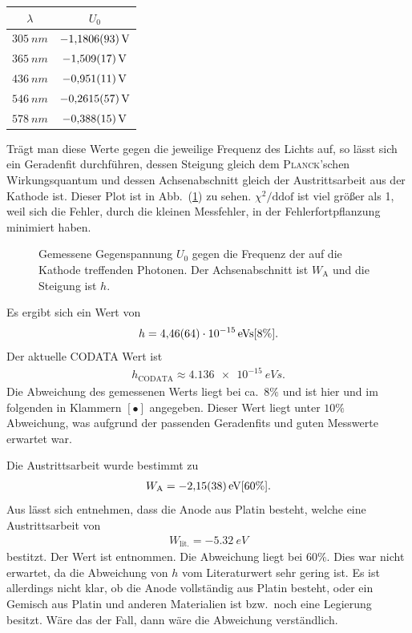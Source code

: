 \documentclass[sn-mathphys-num,iicol]{sn-jnl}
\theoremstyle{thmstyleone}
\theoremstyle{thmstyletwo}
\theoremstyle{thmstylethree}
\begin{document}
\begin{table}[h]
        \begin{tabular}{cc}
                $\lambda $ & $U_0$ \\
                \hline
                $\SI{305}{n m}$ & $\SI{-1.1806+-0.0093}{V}$ \\
                $\SI{365}{n m}$ & $\SI{-1.509+-0.017}{V}$ \\
                $\SI{436}{n m}$ & $\SI{-0.951+-0.011}{V}$ \\
                $\SI{546}{n m}$ & $\SI{-0.2615+-0.0057}{V}$ \\
                $\SI{578}{n m}$ & $\SI{-0.388+-0.015}{V}$ 
        \end{tabular}
\end{table}
Trägt man diese Werte gegen die jeweilige Frequenz des Lichts auf, so lässt sich ein Geradenfit durchführen, dessen Steigung gleich dem \textsc{Planck}'schen Wirkungsquantum und dessen Achsenabschnitt gleich der Austrittsarbeit aus der Kathode ist.
Dieser Plot ist in Abb.\ (\ref{fig:austrittsarbeit}) zu sehen.
$\chi ^2/\text{ddof}$ ist viel größer als 1, weil sich die Fehler, durch die kleinen Messfehler, in der Fehlerfortpflanzung minimiert haben.

\begin{figure}[t]
        \centering
        \resizebox{.5\textwidth}{!}{}
        \caption{Gemessene Gegenspannung $U_0$ gegen die Frequenz der auf die Kathode treffenden Photonen. Der Achsenabschnitt ist $W_\text{A}$ und die Steigung ist $h$.} \label{fig:austrittsarbeit}
\end{figure}
Es ergibt sich ein Wert von
\begin{align} 
        h=\SI{4.46+-0.64e-15}{eVs}[8\%]
.\end{align} 
Der aktuelle CODATA\cite{CODATA} Wert ist
\begin{align} 
        h_\text{CODATA}\approx \SI{4.136e-15}{eVs}
.\end{align} 
Die Abweichung des gemessenen Werts liegt bei ca.\ $8\%$ und ist hier und im folgenden in Klammern $[\bullet]$ angegeben.
Dieser Wert liegt unter $10\%$ Abweichung, was aufgrund der passenden Geradenfits und guten Messwerte erwartet war.

Die Austrittsarbeit wurde bestimmt zu
\begin{align} 
        W_\text{A}=\SI{-2.15+-0.38}{eV}[60\%]
.\end{align} 
Aus \cite{LeyboldPhotoeffekt} lässt sich entnehmen, dass die Anode aus Platin besteht, welche eine Austrittsarbeit von 
\begin{align} 
        W_\text{lit.}=\SI{-5.32}{eV}
\end{align} 
bestitzt.
Der Wert ist \cite{SpektrumPhysik} entnommen.
Die Abweichung liegt bei $60\%$.
Dies war nicht erwartet, da die Abweichung von $h$ vom Literaturwert sehr gering ist.
Es ist allerdings nicht klar, ob die Anode vollständig aus Platin besteht, oder ein Gemisch aus Platin und anderen Materialien ist bzw.\ noch eine Legierung besitzt.
Wäre das der Fall, dann wäre die Abweichung verständlich.
\end{document}
